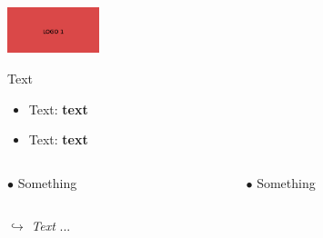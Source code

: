 \begin{frame}
  \begin{center}
      \pause[8]
      \includegraphics[width=0.2\textwidth]{logo1.jpg}
  \end{center}
\end{frame}

\begin{frame}
    \pause\alert{Text}

    \vspace{0.6cm}

    \begin{itemize}
      \item<3-> Text: \textbf{text}
      \item<4-> Text: \textbf{text}
    \end{itemize}

    \vspace{0.6cm}

    \pause[5]
    \begin{columns}[c]
        \begin{column}{3cm}
          $\bullet$ Something
        \end{column}

        \begin{column}{3cm}
          $\bullet$ Something
        \end{column}
    \end{columns}

    \vspace{0.6cm}

    \pause[6]
    $\hookrightarrow$ \textit{Text} ...
\end{frame}

